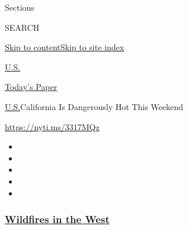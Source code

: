 Sections

SEARCH

\protect\hyperlink{site-content}{Skip to
content}\protect\hyperlink{site-index}{Skip to site index}

\href{https://www.nytimes3xbfgragh.onion/section/us}{U.S.}

\href{https://myaccount.nytimes3xbfgragh.onion/auth/login?response_type=cookie\&client_id=vi}{}

\href{https://www.nytimes3xbfgragh.onion/section/todayspaper}{Today's
Paper}

\href{/section/us}{U.S.}\textbar{}California Is Dangerously Hot This
Weekend

\url{https://nyti.ms/3317MQz}

\begin{itemize}
\item
\item
\item
\item
\item
\end{itemize}

\hypertarget{wildfires-in-the-west}{%
\subsubsection{\texorpdfstring{\href{https://www.nytimes3xbfgragh.onion/spotlight/california-wildfires?name=styln-california-wildfires\&region=TOP_BANNER\&block=storyline_menu_recirc\&action=click\&pgtype=Article\&impression_id=bdc0c790-f52e-11ea-80db-3b33c18ed3ce\&variant=undefined}{Wildfires
in the West}}{Wildfires in the West}}\label{wildfires-in-the-west}}

